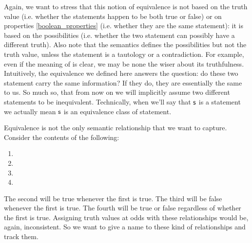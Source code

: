 \documentclass[11pt,letterpaper,fleqn]{memoir} %
\begin{document}
Again, we want to stress that this notion of equivalence is not based on the truth value (i.e. whether the statements happen to be both true or false) or on properties \ref{boolean_properties} (i.e. whether they are the same statement): it is based on the possibilities (i.e. whether the two statement can possibly have a different truth). Also note that the semantics defines the possibilities but not the truth value, unless the statement is a tautology or a contradiction. For example, even if the meaning of  is clear, we may be none the wiser about its truthfulness. Intuitively, the equivalence we defined here answers the question: do these two statement carry the same information? If they do, they are essentially the same to us. So much so, that from now on we will implicitly assume two different statements to be inequivalent. Technically, when we'll say that $\mathsf{s}$ is a statement we actually mean $\mathsf{s}$ is an equivalence class of statement.

Equivalence is not the only semantic relationship that we want to capture. Consider the contents of the following:
\begin{enumerate}
	\item {}
	\item {}
	\item {}
	\item {}
\end{enumerate}
The second will be true whenever the first is true. The third will be false whenever the first is true. The fourth will be true or false regardless of whether the first is true. Assigning truth values at odds with these relationships would be, again, inconsistent. So we want to give a name to these kind of relationships and track them.
\end{document}
